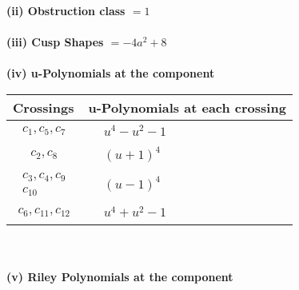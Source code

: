 \documentclass[1p]{elsarticle_modified}
\theoremstyle{definition}
\begin{document}
\flushleft \textbf{(ii) Obstruction class $= 1$}\\~\\
\flushleft \textbf{(iii) Cusp Shapes $= -4 a^2+8$}\\~\\
\newpage\renewcommand{\arraystretch}{1}
\flushleft \textbf{(iv) u-Polynomials at the component}\newline \\
\begin{tabular}{m{50pt}|m{274pt}}
Crossings & \hspace{64pt}u-Polynomials at each crossing \\
\hline $$\begin{aligned}c_{1},c_{5},c_{7}\end{aligned}$$&$\begin{aligned}
&u^4- u^2-1
\end{aligned}$\\
\hline $$\begin{aligned}c_{2},c_{8}\end{aligned}$$&$\begin{aligned}
&(u+1)^4
\end{aligned}$\\
\hline $$\begin{aligned}c_{3},c_{4},c_{9}\\c_{10}\end{aligned}$$&$\begin{aligned}
&(u-1)^4
\end{aligned}$\\
\hline $$\begin{aligned}c_{6},c_{11},c_{12}\end{aligned}$$&$\begin{aligned}
&u^4+u^2-1
\end{aligned}$\\
\hline
\end{tabular}\\~\\
\newpage\renewcommand{\arraystretch}{1}
\flushleft \textbf{(v) Riley Polynomials at the component}\newline \\
\end{document}
